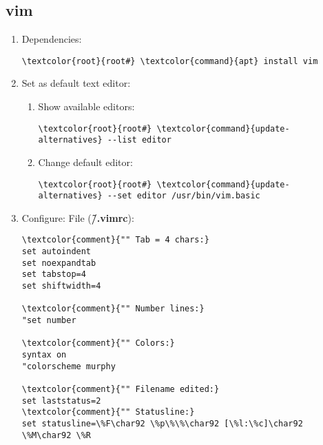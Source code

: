 \documentclass[10pt, a4paper, onecolumn, openany]{book} %
\begin{document}
\subsection{vim}
\begin{enumerate}
    \item Dependencies:
\begin{Verbatim}[commandchars=\\\{\}]
\textcolor{root}{root#} \textcolor{command}{apt} install vim
\end{Verbatim}
    \item Set as default text editor:
    \begin{enumerate}
        \item Show available editors:
        \begin{Verbatim}[commandchars=\\\{\}]
\textcolor{root}{root#} \textcolor{command}{update-alternatives} --list editor
\end{Verbatim}
        \item Change default editor:
\begin{Verbatim}[commandchars=\\\{\}]
\textcolor{root}{root#} \textcolor{command}{update-alternatives} --set editor /usr/bin/vim.basic
\end{Verbatim}
    \end{enumerate}
    \item Configure:
\newline File (\textbf{\textcolor{file}{\~/.vimrc}}):
\begin{Verbatim}[commandchars=\\\{\}]
\textcolor{comment}{"" Tab = 4 chars:}
set autoindent
set noexpandtab
set tabstop=4
set shiftwidth=4

\textcolor{comment}{"" Number lines:}
"set number

\textcolor{comment}{"" Colors:}
syntax on
"colorscheme murphy

\textcolor{comment}{"" Filename edited:}
set laststatus=2
\textcolor{comment}{"" Statusline:}
set statusline=\%F\char92 \%p\%\%\char92 [\%l:\%c]\char92 \%M\char92 \%R
\end{Verbatim}
\end{enumerate}
\end{document}
